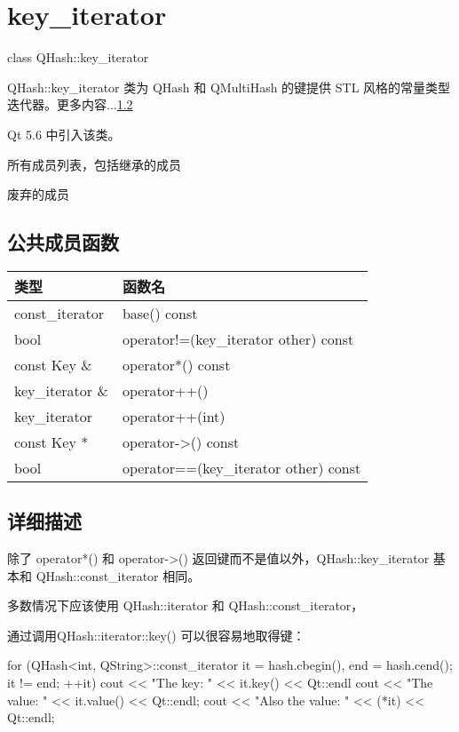 \chapter{key\_iterator}

class QHash::key\_iterator

QHash::key\_iterator 类为 QHash 和 QMultiHash 的键提供 STL 风格的常量类型迭代器。更多内容...\ref{qhash_key_iterator:detail}

Qt 5.6 中引入该类。


\begin{compactitem}
\item 所有成员列表，包括继承的成员
\item 废弃的成员
\end{compactitem}

\splitLine

\section{公共成员函数}

\begin{tabular}{|l|l|}
\hline
类型	&函数名\\
\hline
const\_iterator& 	base() const\\
\hline
bool 	&operator!=(key\_iterator other) const\\
\hline
const Key \& &	operator*() const\\
\hline
key\_iterator \&& 	operator++()\\
\hline
key\_iterator &	operator++(int)\\
\hline
const Key * &	operator->() const\\
\hline
bool 	&operator==(key\_iterator other) const\\
\hline
\end{tabular}

\splitLine

\section{详细描述}\label{qhash_key_iterator:detail}

除了 operator*() 和 operator->() 返回键而不是值以外，QHash::key\_iterator 基本和 QHash::const\_iterator 相同。

多数情况下应该使用 QHash::iterator 和 QHash::const\_iterator，

通过调用QHash::iterator::key() 可以很容易地取得键：

\begin{cppcode}
for (QHash<int, QString>::const_iterator it = hash.cbegin(), 
end = hash.cend(); it != end; ++it) {
    cout << "The key: " << it.key() << Qt::endl
    cout << "The value: " << it.value() << Qt::endl;
    cout << "Also the value: " << (*it) << Qt::endl;
}
\end{cppcode}

